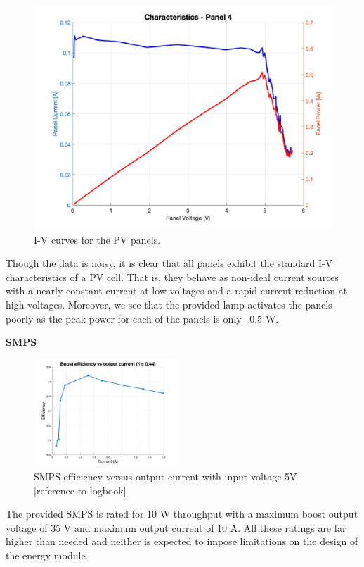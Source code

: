 \documentclass[a4paper]{article}
\begin{document}
\begin{figure}[H]
    \includegraphics[scale=0.18]{Panel4.png}
    \caption{I-V curves for the PV panels.}
    \label{fig:IV_curve}
    \end{figure}

Though the data is noisy, it is clear that all panels exhibit the standard 
I-V characteristics of a PV cell. That is, they behave as non-ideal current 
sources with a nearly constant current at low voltages and a rapid current 
reduction at high voltages\cite{green}. Moreover, we see that the provided lamp activates 
the panels poorly as the peak power for each of the panels is only ~0.5 W.

\textbf{SMPS}
\vspace{10pt} 
\newline
\begin{figure}
    \begin{center}
        \includegraphics[width=0.48\textwidth]{Boost_efficiency_wduty.png}
    \vspace{0pt}
    \end{center}
    \caption{SMPS efficiency versus output current with input voltage 5V [reference to logbook]}
    \label{fig:efficiency}
    \end{figure}
The provided SMPS is rated for 10 W throughput with a maximum boost output voltage of 35 V 
and maximum output current of 10 A\cite{SMPS_lab}. All these ratings are far higher 
than needed and neither is expected to impose limitations on the design of the energy module. 
\end{document}
